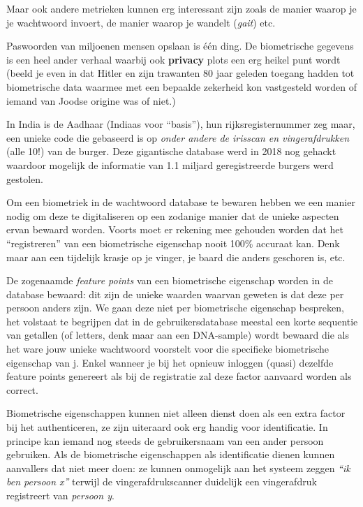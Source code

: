 \documentclass[
  10pt,
  dutch,
  paper=a4,
  ,captions=tableheading
]{scrbook}
\begin{document}
Maar ook andere metrieken kunnen erg interessant zijn zoals de manier
waarop je je wachtwoord invoert, de manier waarop je wandelt
(\emph{gait}) etc.

\begin{warningblock}
Paswoorden van miljoenen mensen opslaan is één ding. De biometrische
gegevens is een heel ander verhaal waarbij ook \textbf{privacy} plots
een erg heikel punt wordt (beeld je even in dat Hitler en zijn trawanten
80 jaar geleden toegang hadden tot biometrische data waarmee met een
bepaalde zekerheid kon vastgesteld worden of iemand van Joodse origine
was of niet.)

In India is de Aadhaar (Indiaas voor ``basis''), hun rijksregisternummer
zeg maar, een unieke code die gebaseerd is op \emph{onder andere de
irisscan en vingerafdrukken} (alle 10!) van de burger. Deze gigantische
database werd in 2018 nog gehackt waardoor mogelijk de informatie van
1.1 miljard geregistreerde burgers werd gestolen.
\end{warningblock}

Om een biometriek in de wachtwoord database te bewaren hebben we een
manier nodig om deze te digitaliseren op een zodanige manier dat de
unieke aspecten ervan bewaard worden. Voorts moet er rekening mee
gehouden worden dat het ``registreren'' van een biometrische eigenschap
nooit 100\% accuraat kan. Denk maar aan een tijdelijk krasje op je
vinger, je baard die anders geschoren is, etc.

De zogenaamde \emph{feature points} van een biometrische eigenschap
worden in de database bewaard: dit zijn de unieke waarden waarvan
geweten is dat deze per persoon anders zijn. We gaan deze niet per
biometrische eigenschap bespreken, het volstaat te begrijpen dat in de
gebruikersdatabase meestal een korte sequentie van getallen (of letters,
denk maar aan een DNA-sample) wordt bewaard die als het ware jouw unieke
wachtwoord voorstelt voor die specifieke biometrische eigenschap van j.
Enkel wanneer je bij het opnieuw inloggen (quasi) dezelfde feature
points genereert als bij de registratie zal deze factor aanvaard worden
als correct.

\begin{tipblock}
Biometrische eigenschappen kunnen niet alleen dienst doen als een extra
factor bij het authenticeren, ze zijn uiteraard ook erg handig voor
identificatie. In principe kan iemand nog steeds de gebruikersnaam van
een ander persoon gebruiken. Als de biometrische eigenschappen als
identificatie dienen kunnen aanvallers dat niet meer doen: ze kunnen
onmogelijk aan het systeem zeggen \emph{``ik ben persoon x''} terwijl de
vingerafdrukscanner duidelijk een vingerafdruk registreert van
\emph{persoon y}.
\end{tipblock}
\end{document}
